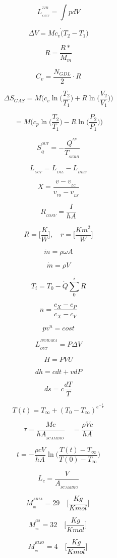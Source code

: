 \documentclass[10pt,portrait,a4paper]{article}
\begin{document}
\begin{multicols}{2}
		


\[L_{_{OUT}}^{^{TIR}}=\int pdV \]

\[\Delta V=Mc_{v}\dot (T_{2}-T_{1}) \]

\[R=\frac {R*}{M_{m}}\]

\[C_{v}=\frac{N_{GDL}}{2}\cdot R\]

\[\Delta S_{GAS} = M\bigg( c_v \ln \bigg( \frac{T_2}{T_1} \bigg)
		+R \ln \bigg( \frac{V_2}{V_1} \bigg) \bigg) \] \par
\[ = M\bigg( c_p \ln \bigg( \frac{T_2}{T_1} \bigg)
		- R \ln \bigg( \frac{P_2}{P_1} \bigg) \bigg)\]

\[ S_{_Q}^{^{OUT}}= - \frac{Q^{^{IN}}}{T_{_{SERB}}} \]

\[L_{_{OUT}}= L_{_{DIL}}- L_{_{DISS}} \]

\[ X =\frac{v - v_{_{LC}}}{v_{_{VS}} - v_{_{LS}}}\]


\[ R_{_{CONV}} =\frac{I}{hA}\]
	
\[ R = \Big [\frac {K}{W}\Big ], \quad  r =\Big [\frac{Km^{2}}{W} \Big ]\]



\[ \dot m = \rho \omega A \]

\[ \dot m = \rho V \]


\[ T_{i} = T_{0} - \dot Q \sum _{0}^{i} R \]	

\[ n = \frac {c_{X} - c_{P}}       {c_{X} - c_{V}} \]

\[pv^{n} = cost  \]

\[L_{_{OUT}}^{^{ISOBARA}}= P \Delta V \]

\[ H = PVU \]

\[ dh = cdt + vdP \]
	
\[ds= c \frac{dT}{T}\]

\[T(t) = T_{\infty} + (T_{0}-T_{\infty})^{e^{- \frac {t}{T}} }\]

\[ \tau = \frac {Mc}{hA_{_{SCAMBIO}}} \quad   = \frac{\rho Vc}{hA} \]

\[t = -  \frac {\rho cV}{hA} \ln \bigg ( \frac {T(t)-T_{\infty}}{T(0)-T_{\infty}}  \bigg )\]

\[ L_{c} = \frac {V}{A_{_{SCAMBIO}}} \]



\[ M_{_{m}}^{^{ARIA}} = 29 \quad \Big [ \frac {Kg}{Kmol} \Big ] \ \]

\[ M_{_{m}}^{^{O2}} = 32 \quad \Big [ \frac {Kg}{Kmol} \Big ] \ \]

\[ M_{_{m}}^{^{ELIO}} = 4 \quad \Big [ \frac {Kg}{Kmol} \Big ] \ \]


\end{multicols}
\end{document}
